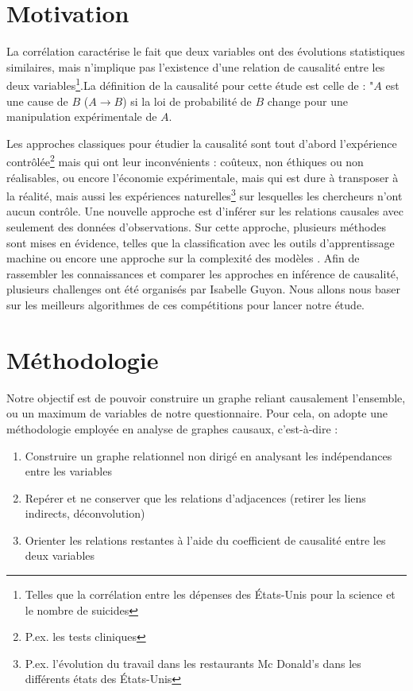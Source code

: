 \documentclass[11pt,fleqn,openany,frenchb]{book} %
\begin{document}
\section{Motivation}
La corrélation caractérise le fait que deux variables ont des évolutions statistiques similaires, mais n'implique pas l'existence d'une relation de causalité entre les deux variables\footnote{Telles que la corrélation entre les dépenses des \'Etats-Unis pour la  science et le nombre de suicides}.La définition de la causalité pour cette étude est celle de \cite{statnikov2012new} : "$A$ est une cause de $B$ ($A \rightarrow B$) si la loi de probabilité de $B$ change pour une manipulation expérimentale de $A$. \par
Les approches classiques pour étudier la causalité sont tout d'abord l'expérience contrôlée\footnote{P.ex. les tests cliniques} mais qui ont leur inconvénients : coûteux, non éthiques ou non réalisables, ou encore l'économie expérimentale, mais qui est dure à transposer à la réalité, mais aussi les expériences naturelles\footnote{P.ex. l'évolution du travail dans les restaurants Mc Donald's dans les différents états des \'Etats-Unis} sur lesquelles les chercheurs n'ont aucun contrôle. Une nouvelle approche est d'inférer sur les relations causales avec seulement des données d'observations. Sur cette approche, plusieurs méthodes sont mises en évidence, telles que la classification avec les outils d'apprentissage machine ou encore une approche sur la complexité des modèles \cite{stegle2010probabilistic}. Afin de rassembler les connaissances et comparer les approches en inférence de causalité, plusieurs challenges ont été organisés par Isabelle Guyon. Nous allons nous baser sur les meilleurs algorithmes de ces compétitions pour lancer notre étude.   

\section{Méthodologie}
Notre objectif est de pouvoir construire un graphe reliant causalement l'ensemble, ou un maximum de variables de notre questionnaire. Pour cela, on adopte %
une méthodologie employée en analyse de graphes causaux, c'est-à-dire :

\begin{enumerate}
\item Construire un graphe relationnel non dirigé en analysant les indépendances entre les variables
\item Repérer et ne conserver que les relations d'adjacences (retirer les liens indirects, déconvolution)
\item Orienter les relations restantes à l'aide du coefficient de causalité entre les deux variables 
\end{enumerate}
\end{document}
